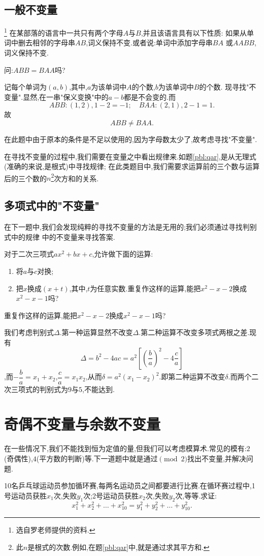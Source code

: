 \subsection{一般不变量}
\begin{problem}\footnote{选自罗老师提供的资料.}
    在某部落的语言中一共只有两个字母$A$与$B$,并且该语言具有以下性质:
    如果从单词中删去相邻的字母串$AB$,词义保持不变.或者说:单词中添加字母串$BA$
    或$AABB$,词义保持不变.

    问:$ABB=BAA$吗?
\end{problem}
\begin{solution}
    记每个单词为$(a,b)$,其中,$a$为该单词中$A$的个数,$b$为该单词中$B$的个数.
    现寻找"不变量".显然,在一串"保义变换"中的$a-b$都是不会变的.而$$ABB:(1,2),1-2=-1;\quad BAA:(2,1),2-1=1.$$
    故$$ABB\neq BAA.$$
\end{solution}
在此题中由于原本的条件是不足以使用的,因为字母数太少了,故考虑寻找"不变量".

在寻找不变量的过程中,我们需要在变量之中看出规律来.如题\ref{pbl:qar},是从无理式(准确的来说,是根式)中寻找规律;
在此类题目中,我们需要求运算前的三个数与运算后的三个数的$n$\footnote{此$n$是根式的次数.例如,在题\ref{pbl:qar}中,就是通过求其平方和.}次方和的关系.
\subsection{多项式中的"不变量"}
在下一题中,我们会发现纯粹的寻找不变量的方法是无用的;我们必须通过寻找判别式中的规律
中的不变量来寻找答案.
\begin{problem}
    对于二次三项式$ax^2+bx+c$,允许做下面的运算:
    \begin{enumerate}
        \item 将$a$与$c$对换;
        \item 把$x$换成$(x+t)$,其中,$t$为任意实数.重复作这样的运算,能把$x^2-x-2$换成$x^2-x-1$吗?
    \end{enumerate}
    重复作这样的运算,能把$x^2-x-2$换成$x^2-x-1$吗?
\end{problem}
\begin{solution}
    我们考虑判别式$\Delta$.第一种运算显然不改变$\Delta$.第二种运算不改变多项式两根之差.现有$$\Delta=b^2-4ac=a^2\left[\left(\dfrac{b}{a}\right)^2-4\dfrac{c}{a}\right]$$,而$-\dfrac{b}{a}=x
    _1+x_2$,$\dfrac{c}{a}=x_1x_2$,从而$\delta=a^2\left( x_1-x_2 \right)^2.$即第二种运算不改变$\delta.$而两个二次三项式的判别式为$9$与$5$,不能达到.
\end{solution}
\section{奇偶不变量与余数不变量}
在一些情况下,我们不能找到恒为定值的量,但我们可以考虑模算术.常见的模有:$2$(奇偶性),$4$(平方数的判断)等.下一道题中就是通过$\pmod 2$找出不变量,并解决问题.
\begin{problem}
    10名乒乓球运动员参加循环赛,每两名运动员之间都要进行比赛.在循环赛过程中,1号运动员获胜$x_1$次,失败$y_1$次;2号运动员获胜$x_2$次,失败$y_2$次,等等.求证:
$$x_1^2+x_2^2+…+x_{10}^2=y_1^2+y_{2}^2+…+y_{10}^2.$$

\end{problem}